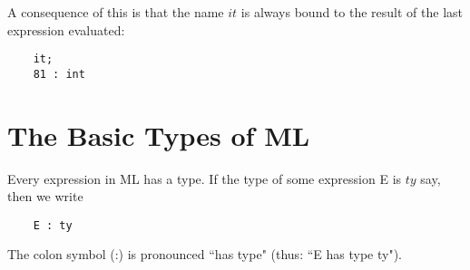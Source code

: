 A consequence of this is that the name $it$ is always bound to the
result of the last expression evaluated:
\begin{verbatim}
    it;
    81 : int
\end{verbatim}


\section{The Basic Types of ML}                                                             

Every expression in ML has a type. If the type of some expression E is
$ty$ say, then we write
\begin{verbatim}
    E : ty
\end{verbatim}

The colon symbol (:) is pronounced ``has type" (thus: ``E has type ty").


